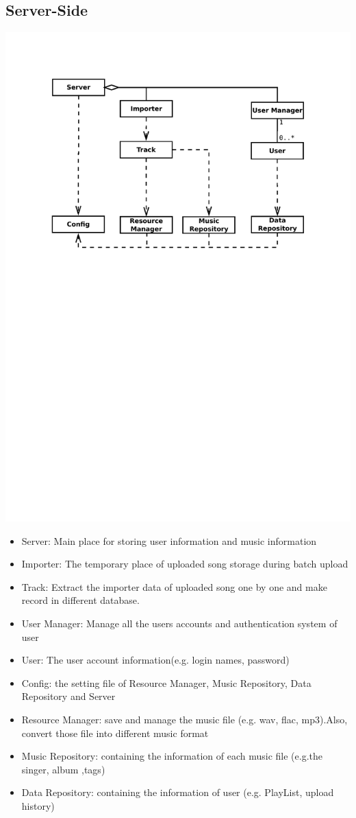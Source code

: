 \documentclass[12pt, a4paper, oneside]{article}
\newcommand{\env}[2]{\begin{#1}#2\end{#1}}
\begin{document}
\subsection{Server-Side}
\includegraphics[trim = 25mm 160mm 25mm 20mm, clip, width=\textwidth]{fig/uml_class_Server}
\env{itemize} {
\item Server: Main place for storing user information and music information
\item Importer: The temporary place of uploaded song storage during batch upload
\item Track: Extract the importer data of uploaded song one by one and make record in different database. 
\item User Manager: Manage all the users accounts and authentication system of user
\item User: The user account information(e.g. login names, password)
\item Config: the setting file of Resource Manager, Music Repository, Data Repository and Server
\item Resource Manager: save and manage the music file (e.g. wav, flac, mp3).Also, convert those file into different music format
\item Music Repository: containing the information of each music file (e.g.the singer, album ,tags)
\item Data Repository: containing the information of user (e.g. PlayList, upload history)
}
\end{document}
